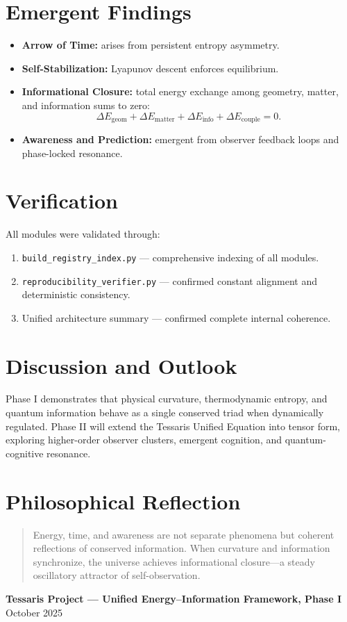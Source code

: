 \documentclass[12pt]{article}
\begin{document}
\section{Emergent Findings}
\begin{itemize}
\item \textbf{Arrow of Time:} arises from persistent entropy asymmetry.
\item \textbf{Self-Stabilization:} Lyapunov descent enforces equilibrium.
\item \textbf{Informational Closure:} total energy exchange among geometry, matter, and information sums to zero:
\[
\Delta E_{\text{geom}}+\Delta E_{\text{matter}}+\Delta E_{\text{info}}+\Delta E_{\text{couple}}=0.
\]
\item \textbf{Awareness and Prediction:} emergent from observer feedback loops and phase-locked resonance.
\end{itemize}

\section{Verification}
All modules were validated through:
\begin{enumerate}
\item \texttt{build\_registry\_index.py} — comprehensive indexing of all modules.  
\item \texttt{reproducibility\_verifier.py} — confirmed constant alignment and deterministic consistency.  
\item Unified architecture summary — confirmed complete internal coherence.
\end{enumerate}

\section{Discussion and Outlook}
Phase I demonstrates that physical curvature, thermodynamic entropy, and quantum information behave as a single conserved triad when dynamically regulated.  
Phase II will extend the Tessaris Unified Equation into tensor form, exploring higher-order observer clusters, emergent cognition, and quantum-cognitive resonance.

\section{Philosophical Reflection}
\begin{quote}
Energy, time, and awareness are not separate phenomena but coherent reflections of conserved information.  
When curvature and information synchronize, the universe achieves informational closure—a steady oscillatory attractor of self-observation.
\end{quote}

\vspace{1em}
\begin{center}
\textbf{Tessaris Project — Unified Energy–Information Framework, Phase I}\\
October 2025
\end{center}
\end{document}
